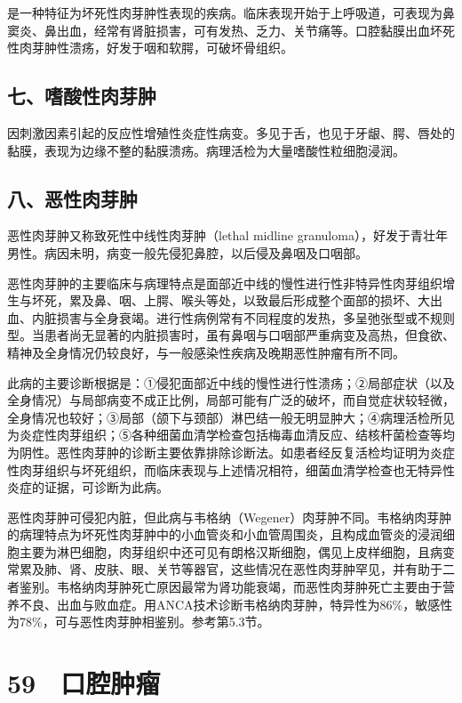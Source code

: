 是一种特征为坏死性肉芽肿性表现的疾病。临床表现开始于上呼吸道，可表现为鼻窦炎、鼻出血，经常有肾脏损害，可有发热、乏力、关节痛等。口腔黏膜出血坏死性肉芽肿性溃疡，好发于咽和软腭，可破坏骨组织。

\subsection{七、嗜酸性肉芽肿}

因刺激因素引起的反应性增殖性炎症性病变。多见于舌，也见于牙龈、腭、唇处的黏膜，表现为边缘不整的黏膜溃疡。病理活检为大量嗜酸性粒细胞浸润。

\subsection{八、恶性肉芽肿}

恶性肉芽肿又称致死性中线性肉芽肿（lethal midline
granuloma），好发于青壮年男性。病因未明，病变一般先侵犯鼻腔，以后侵及鼻咽及口咽部。

恶性肉芽肿的主要临床与病理特点是面部近中线的慢性进行性非特异性肉芽组织增生与坏死，累及鼻、咽、上腭、喉头等处，以致最后形成整个面部的损坏、大出血、内脏损害与全身衰竭。进行性病例常有不同程度的发热，多呈弛张型或不规则型。当患者尚无显著的内脏损害时，虽有鼻咽与口咽部严重病变及高热，但食欲、精神及全身情况仍较良好，与一般感染性疾病及晚期恶性肿瘤有所不同。

此病的主要诊断根据是：①侵犯面部近中线的慢性进行性溃疡；②局部症状（以及全身情况）与局部病变不成正比例，局部可能有广泛的破坏，而自觉症状较轻微，全身情况也较好；③局部（颌下与颈部）淋巴结一般无明显肿大；④病理活检所见为炎症性肉芽组织；⑤各种细菌血清学检查包括梅毒血清反应、结核杆菌检查等均为阴性。恶性肉芽肿的诊断主要依靠排除诊断法。如患者经反复活检均证明为炎症性肉芽组织与坏死组织，而临床表现与上述情况相符，细菌血清学检查也无特异性炎症的证据，可诊断为此病。

恶性肉芽肿可侵犯内脏，但此病与韦格纳（Wegener）肉芽肿不同。韦格纳肉芽肿的病理特点为坏死性肉芽肿中的小血管炎和小血管周围炎，且构成血管炎的浸润细胞主要为淋巴细胞，肉芽组织中还可见有朗格汉斯细胞，偶见上皮样细胞，且病变常累及肺、肾、皮肤、眼、关节等器官，这些情况在恶性肉芽肿罕见，并有助于二者鉴别。韦格纳肉芽肿死亡原因最常为肾功能衰竭，而恶性肉芽肿死亡主要由于营养不良、出血与败血症。用ANCA技术诊断韦格纳肉芽肿，特异性为86\%，敏感性为78\%，可与恶性肉芽肿相鉴别。参考第5.3节。

\protect\hypertarget{text00152.html}{}{}

\section{59　口腔肿瘤}

